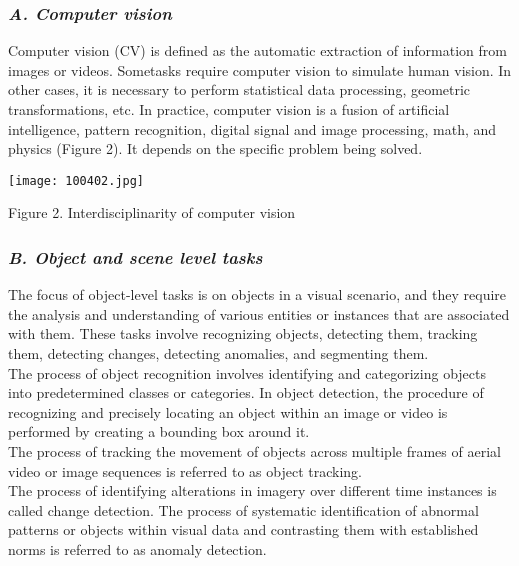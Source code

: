 \documentclass{article}
\begin{document}
{{\begin{multicols}
   \subsubsection*{ \textit{A. Computer vision}}
    \hspace{4mm}Computer vision (CV) is defined as the automatic extraction of information from images or videos. Sometasks require computer vision to simulate human vision. In other cases, it is necessary to perform statistical data processing, geometric transformations, etc. In practice, computer vision is a fusion of artificial intelligence, pattern recognition, digital signal and image processing, math, and physics (Figure 2). It depends on the specific problem being solved. \par   
    \begin{fi}
        \texttt{[image: 100402.jpg]}
        \caption{Figure 2. Interdisciplinarity of computer vision}
        \label{fig:enter-label}
    \end{fi}
    \setcounter{page}{103}
\newpage
\center\subsubsection*{\textit{ B. Object and scene level tasks}}
\begin{flushleft}\hspace{4mm}The focus of object-level tasks is on objects in a visual scenario, and they require the analysis and understanding of various entities or instances that are associated with them. These tasks involve recognizing objects, detecting them, tracking them, detecting changes, detecting anomalies, and segmenting them. 
\\\hspace{4mm}The process of object recognition involves identifying and categorizing objects into predetermined classes or categories. In object detection, the procedure of recognizing and precisely locating an object within an image or video is performed by creating a bounding box around it. \\\hspace{4mm}The process of tracking the movement of objects across multiple frames of aerial video or image sequences is referred to as object tracking. \\\hspace{4mm}The process of identifying alterations in imagery over different time instances is called change detection. The process of systematic identification of abnormal patterns or objects within visual data and contrasting them with established norms is referred to as anomaly detection. 

\end{flushleft}
\end{multicols}}}
\end{document}

